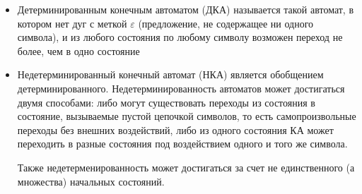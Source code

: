 \documentclass{article}
\begin{document}
\begin{itemize}
	\item Детерминированным конечным автоматом (ДКА) называется такой автомат, в котором нет дуг с меткой $\varepsilon$ (предложение, не содержащее ни одного символа), и из любого состояния по любому символу возможен переход не более, чем в одно состояние
	\item Недетерминированный конечный автомат (НКА) является обобщением детерминированного. Недетерминированность автоматов может достигаться двумя способами: либо могут существовать переходы из состояния в состояние, вызываемые пустой цепочкой символов, то есть самопроизвольные переходы без внешних воздействий, либо из одного состояния КА может переходить в разные состояния под воздействием одного и того же символа.
	
	Также недетерменированность может достигаться за счет не единственного (а множества) начальных состояний.
\end{itemize}


\end{document}
